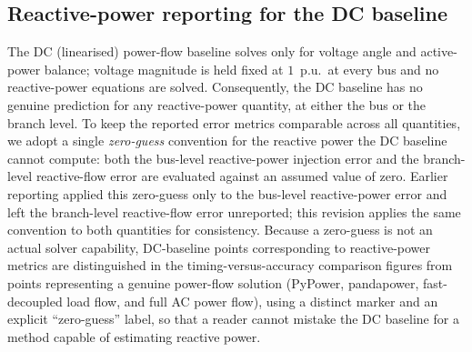 
\subsection{Reactive-power reporting for the DC baseline}
\label{sec:dc-baseline-reactive-reporting}

The DC (linearised) power-flow baseline solves only for voltage angle and active-power balance; voltage magnitude is held fixed at $1$~p.u.\ at every bus and no reactive-power equations are solved.
Consequently, the DC baseline has no genuine prediction for any reactive-power quantity, at either the bus or the branch level.
To keep the reported error metrics comparable across all quantities, we adopt a single \emph{zero-guess} convention for the reactive power the DC baseline cannot compute: both the bus-level reactive-power injection error and the branch-level reactive-flow error are evaluated against an assumed value of zero.
Earlier reporting applied this zero-guess only to the bus-level reactive-power error and left the branch-level reactive-flow error unreported; this revision applies the same convention to both quantities for consistency.
Because a zero-guess is not an actual solver capability, DC-baseline points corresponding to reactive-power metrics are distinguished in the timing-versus-accuracy comparison figures from points representing a genuine power-flow solution (PyPower, pandapower, fast-decoupled load flow, and full AC power flow), using a distinct marker and an explicit ``zero-guess'' label, so that a reader cannot mistake the DC baseline for a method capable of estimating reactive power.
